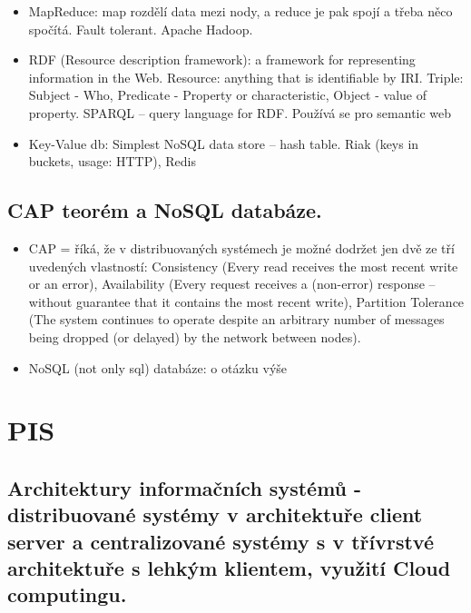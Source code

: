 \documentclass[a4paper,hidelinks]{article}
\begin{document}
\begin{itemize}
\begin{itemize}
        \item MapReduce: map rozdělí data mezi nody, a reduce je pak spojí a třeba něco spočítá. Fault tolerant. Apache Hadoop.
        \item RDF (Resource description framework): a framework for representing information in the Web. Resource: anything that is identifiable by IRI. Triple: Subject - Who, Predicate - Property or characteristic, Object - value of property. SPARQL -- query language for RDF. Používá se pro semantic web
        \item Key-Value db: Simplest NoSQL data store -- hash table. Riak (keys in buckets, usage: HTTP), Redis 
    \end{itemize}
\end{itemize}

\subsection{CAP teorém a NoSQL databáze.}

\begin{itemize}
    \item CAP = říká, že v distribuovaných systémech je možné dodržet jen dvě ze tří uvedených vlastností: Consistency (Every read receives the most recent write or an error), Availability (Every request receives a (non-error) response – without guarantee that it contains the most recent write), Partition Tolerance (The system continues to operate despite an arbitrary number of messages being dropped (or delayed) by the network between nodes).
    \item NoSQL (not only sql) databáze: o otázku výše
\end{itemize}


\section{PIS}

\subsection{Architektury informačních systémů - distribuované systémy v architektuře client server a centralizované systémy s v třívrstvé architektuře s lehkým klientem, využití Cloud computingu.}
\end{document}
